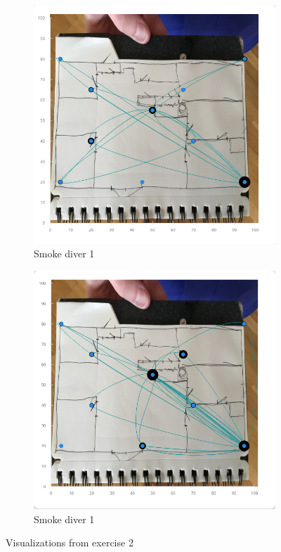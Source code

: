 \documentclass[../Main/thesis.tex]{subfiles}
\begin{document}
\begin{figure}[h]
	\centering
	\begin{subfigure}{0.45\textwidth}
		\includegraphics[width=\textwidth]{../fig/eval_2_remi}
		\caption{Smoke diver 1}
		\label{fig:eval-visualization-2-1-app}
	\end{subfigure}
	\begin{subfigure}{0.45\textwidth}
		\includegraphics[width=\textwidth]{../fig/eval_2_fredrik}
		\caption{Smoke diver 1}
		\label{fig:eval-visualization-2-2-app}
	\end{subfigure}
	\caption{Visualizations from exercise 2}
	\label{fig:eval-visualization-2-app}
\end{figure}
\end{document}
